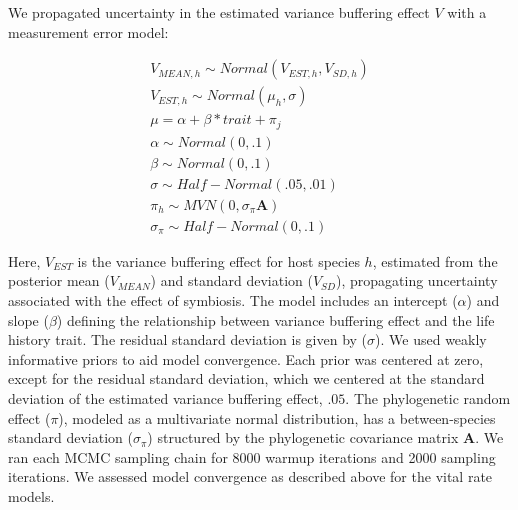 \documentclass[lineno, sn-basic]{sn-jnl}%
\begin{document}
We propagated uncertainty in the estimated variance buffering effect $V$ with a measurement error model:

\begin{subequations}
	\begin{align}
		V_{MEAN,h} \sim Normal(V_{EST,h}, V_{SD,h})\\
		V_{EST,h} \sim Normal(\mu_h,\sigma)\\
		\mu = \alpha + \beta*trait + \pi _j\\
		\alpha \sim Normal(0,.1)\\
		\beta \sim Normal(0,.1)\\
		\sigma \sim Half-Normal(.05,.01)\\
		\pi_h \sim MVN(0,\sigma_{\pi}\mathbf{A})\\
		\sigma_{\pi} \sim Half-Normal(0,.1)
	\end{align}
\end{subequations}

Here, $V_{EST}$ is the variance buffering effect for host species $h$, estimated from the posterior mean ($V_{MEAN}$) and standard deviation ($V_{SD}$), propagating uncertainty associated with the effect of symbiosis.
The model includes an intercept ($\alpha$) and slope ($\beta$) defining the relationship between variance buffering effect and the life history trait. 
The residual standard deviation is given by ($\sigma$). 
We used weakly informative priors to aid model convergence.
Each prior was centered at zero, except for the residual standard deviation, which we centered at the standard deviation of the estimated variance buffering effect, $.05$.
The phylogenetic random effect ($\pi$), modeled as a multivariate normal distribution, has a between-species standard deviation ($\sigma_{\pi}$) structured by the phylogenetic covariance matrix \textbf{A}.
We ran each MCMC sampling chain for 8000 warmup iterations and 2000 sampling iterations. 
We assessed model convergence as described above for the vital rate models.
\end{document}
